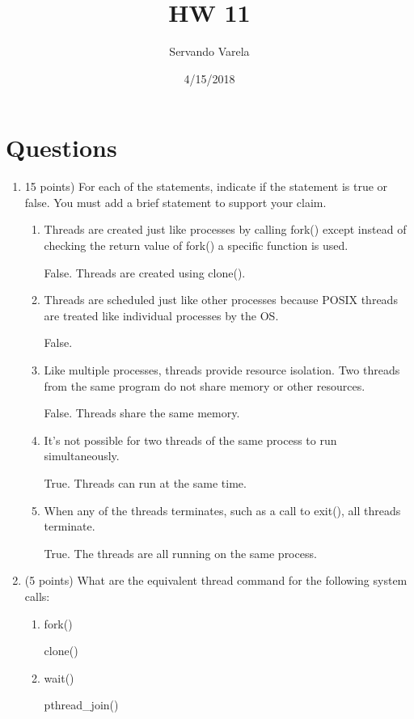 \documentclass{article}[9pt]
\title{HW 11}
\author{Servando Varela}
\date{4/15/2018}
\newenvironment{answerfont}{\fontfamily{qhv}\selectfont}{\par}
\newenvironment{myanswer}{\begin{mdframed}\begin{answerfont}}{\end{answerfont}\end{mdframed}}
\begin{document}
\maketitle
\section*{Questions}
\label{sec:org3ac93b9}

\begin{enumerate}

\item 15 points) For each of the statements, indicate if the statement is true or false. You must add a brief statement to support your claim. 
  \begin{enumerate}
    \item Threads are created just like processes by calling fork() except instead of checking the return value of fork() a specific function is used.
      \begin{myanswer}
        False. Threads are created using clone().
      \end{myanswer}
    \item Threads are scheduled just like other processes because POSIX threads are treated like individual processes by the OS.
      \begin{myanswer}
        False. 
      \end{myanswer}
    \item Like multiple processes, threads provide resource isolation. Two threads from the same program do not share memory or other resources.
      \begin{myanswer}
        False. Threads share the same memory.
      \end{myanswer}
    \item It's not possible for two threads of the same process to run simultaneously.
      \begin{myanswer}
        True. Threads can run at the same time.
      \end{myanswer}
    \item When any of the threads terminates, such as a call to exit(), all threads terminate.
      \begin{myanswer}
        True. The threads are all running on the same process.
      \end{myanswer}
  \end{enumerate}

\item (5 points) What are the equivalent thread command for the following system calls:
  \begin{enumerate}
    \item fork()
      \begin{myanswer}
        clone()
      \end{myanswer}
    \item wait()
      \begin{myanswer}
        pthread\_join()
      \end{myanswer}
  \end{enumerate}



\end{enumerate}
\end{document}

